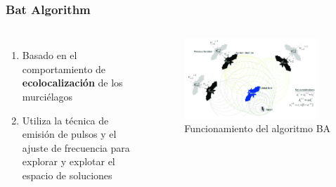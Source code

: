 \begin{frame}
  \frametitle{Bat Algorithm}
  \begin{columns}
    \begin{enumerate}
      \item Basado en el comportamiento de \textbf{ecolocalización} de los murciélagos
      \item Utiliza la técnica de emisión de pulsos y el ajuste de frecuencia para explorar y explotar el espacio de soluciones
    \end{enumerate}
    \begin{figure}
      \begin{center}
        \includegraphics[width=0.9\textwidth]{imagenes/chapter3/ba.png}
      \end{center}
      \caption{Funcionamiento del algoritmo BA}
    \end{figure}
  \end{columns}
\end{frame}

